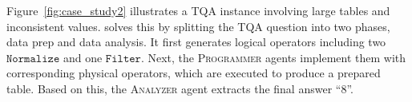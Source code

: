 Figure~\ref{fig:case_study2} illustrates a TQA instance involving large tables and inconsistent values. 
\sys solves this by splitting the TQA question into two phases, \ie data prep and data analysis. It first generates logical operators including two $\mathtt{Normalize}$ and one $\mathtt{Filter}$. Next, the \textsc{Programmer} agents implement them with corresponding physical operators, which are executed to produce a prepared table. Based on this, the \textsc{Analyzer} agent extracts the final answer ``8''.
